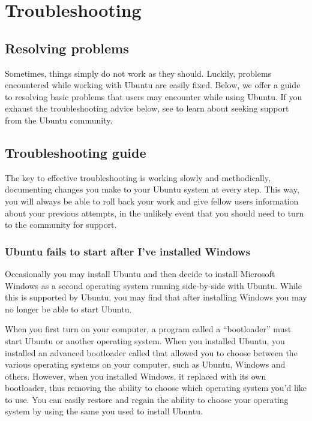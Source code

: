 
\chapter{Troubleshooting}
\label{ch:troubleshooting}

\section{Resolving problems}
\label{sec:troubleshooting:resolving-problems}
Sometimes, things simply do not work as they should. Luckily, problems encountered while working with Ubuntu are easily fixed. Below, we offer a guide to resolving basic problems that users may encounter while using Ubuntu. If you exhaust the troubleshooting advice below, see  to learn about seeking support from the Ubuntu community.

\section{Troubleshooting guide}
\label{sec:troubleshooting:troubleshooting-guide}

The key to effective troubleshooting is working slowly and methodically, documenting changes you make to your Ubuntu system at every step. This way, you will always be able to roll back your work \dash and give fellow users information about your previous attempts, in the unlikely event that you should need to turn to the community for support.

\subsection{Ubuntu fails to start after I've installed Windows}
Occasionally you may install Ubuntu and then decide to install Microsoft Windows as a second operating system running side-by-side with Ubuntu. 
While this is supported by Ubuntu, you may find that after installing Windows you may no longer be able to start Ubuntu.

When you first turn on your computer, a program called a ``bootloader'' must start Ubuntu or another operating system. 
When you installed Ubuntu, you installed an advanced bootloader called \textbf{} that allowed you to choose between the various operating systems on your computer, such as Ubuntu, Windows and others. 
However, when you installed Windows, it replaced  with its own bootloader, thus removing the ability to choose which operating system you'd like to use.
You can easily restore  \dash and regain the ability to choose your operating system \dash by using the same  you used to install Ubuntu.

